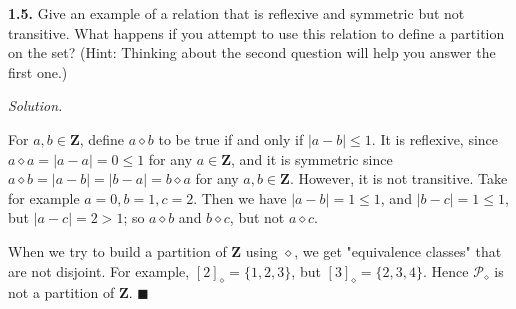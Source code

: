 \documentclass[14pt,parskip=full]{scrartcl}
\newcommand{\exercise}[3]{
\noindent
\textbf{#1.} #2

\noindent
\textit{Solution.}{\let\tpar\par \let\par\relax #3}
}
\newcommand*{\QEDA}{\hfill\ensuremath{\blacksquare}}
\newcommand\abs[1]{\left|#1\right|}
\begin{document}
\exercise
{1.5}{Give an example of a relation that is reflexive and symmetric but not
transitive. What happens if you attempt to use this relation to define a
partition on the set? (Hint: Thinking about the second question will help you
answer the first one.)}{

For $a,b\in \mathbf{Z}$, define $a\diamond b$ to be true if and only if
$\abs{a-b}
\leq 1$. It is reflexive, since $a\diamond a = \abs{a-a} = 0 \leq 1$ for any $a\in
\mathbf{Z}$, and it is symmetric since $a\diamond b = \abs{a-b} = \abs{b-a} = b\diamond
a$ for any $a,b\in \mathbf{Z}$. However, it is not transitive. Take for example
$a=0, b=1, c=2$.  Then we have $\abs{a-b} = 1\leq 1$, and $\abs{b-c} = 1\leq 1$, but
$\abs{a-c} = 2 > 1$; so $a\diamond b$ and $b\diamond c$, but not $a\diamond c$.

\tpar
When we try to build a partition of $\mathbf{Z}$ using $\diamond$, we get
"equivalence classes" that are not disjoint. For example, $[2]_{\diamond} =
\{1,2,3\}$, but $[3]_{\diamond} = \{2,3,4\}$. Hence $\mathscr{P}_{\diamond}$ is
not a partition of $\mathbf{Z}$.
\QEDA

}
\end{document}
